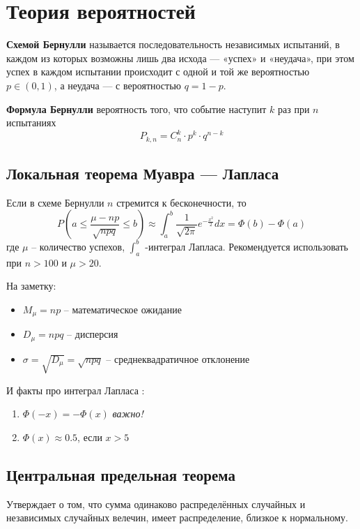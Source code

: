 



\section{Теория вероятностей}

\textbf{Схемой Бернулли}  называется последовательность независимых испытаний, в каждом из которых возможны лишь два исхода — «успех» и «неудача», при этом успех в каждом испытании происходит с одной и той же вероятностью  $p \in (0, 1)$, а неудача — с вероятностью $q = 1 - p$.

\textbf{Формула Бернулли} вероятность того, что событие наступит $k$ раз при $n$ испытаниях
\begin{equation}
	P_{k,n}=C_n^k\cdot p^k \cdot q^{n-k}
\end{equation}

\subsection{Локальная теорема Муавра — Лапласа}

Если в схеме Бернулли $n$ стремится к бесконечности, то  
\begin{equation}
	P(a \leq\frac{\mu - np}{\sqrt{npq}} \leq b) 	\approx \int_{a}^{b} \frac{1}{\sqrt{2\pi}} e^{-\frac{x^2}{2}} dx = \Phi(b) - \Phi(a)
\end{equation}
где $\mu$ -- количество успехов, $\int_a^b$ -интеграл Лапласа. Рекомендуется использовать при $n > 100$ и $\mu > 20$. 

На заметку:
\begin{itemize}
	\item $M_{\mu} = np$ -- математическое ожидание
	\item $D_{\mu} = npq$ -- дисперсия
	\item $ \sigma = \sqrt{D_{\mu}} = \sqrt{npq}$ -- среднеквадратичное отклонение
\end{itemize}
\vspace{1em}
И факты про интеграл Лапласа :
\begin{enumerate}
	\item $\Phi(-x) = - \Phi(x)$ \textit{важно!}
	\item $\Phi(x)\approx  0.5$, если $x > 5$
\end{enumerate}

\subsection{Центральная предельная теорема}
Утверждает о том, что сумма одинаково распределённых случайных и независимых случайных велечин, имеет распределение, близкое к нормальному.

